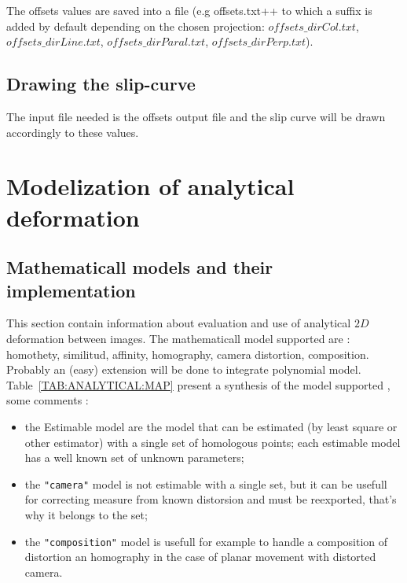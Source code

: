 The offsets values are saved into a file (e.g \verb++offsets.txt++ to which a suffix is added by default depending on the chosen projection: $offsets\_dirCol.txt$,  $offsets\_dirLine.txt$, $offsets\_dirParal.txt$, $offsets\_dirPerp.txt$).

\subsection{Drawing the slip-curve}
The input file needed is the offsets output file and the slip curve will be drawn accordingly to these values.



\section{Modelization of analytical deformation}

\subsection{Mathematicall models and their implementation}

This section contain information about evaluation and use of analytical  $2D$
deformation  between images. The mathematicall model supported are :
homothety, similitud, affinity, homography, camera distortion, composition.
Probably an (easy) extension will be done to integrate  polynomial model.
Table~\ref{TAB:ANALYTICAL:MAP} present a synthesis of the model supported ,
some comments :

\begin{itemize}
   \item the Estimable model are the model that can be estimated (by least square or
         other estimator) with a single set of homologous points; each estimable model 
         has a well known set of unknown parameters;

   \item the {\tt "camera"} model is not estimable with a single set, but it can be usefull
         for correcting measure from known distorsion and must be reexported, that's why it belongs 
         to the set;

   \item the {\tt "composition"} model is usefull for example to  handle a composition of
         distortion an homography in the case of planar movement with distorted camera.
\end{itemize}



